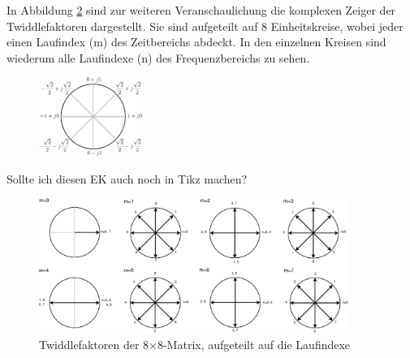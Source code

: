  In Abbildung \ref{pic:Twiddlefaktoren_Darstellung8x8} sind zur weiteren Veranschaulichung die komplexen Zeiger der Twiddlefaktoren dargestellt. Sie sind aufgeteilt auf 8 
 Einheitskreise, wobei jeder einen Laufindex (m) des Zeitbereichs abdeckt. In den einzelnen Kreisen sind wiederum alle Laufindexe (n) des Frequenzbereichs zu sehen.
 

 \begin{figure}[!t]
  \centering
  \includegraphics[width=0.3\textwidth]{img/Einheitskreis-crop.pdf}
  \label{pic:Einheitskreis}
\end{figure}
  
  

  Sollte ich diesen EK auch noch in Tikz machen?


\begin{figure}[!ht]
 \centering
 \includegraphics[width=0.9\textwidth]{img/Twiddlefaktoren_Einheitskreis.eps}
 \caption{Twiddlefaktoren der 8$\times$8-Matrix, aufgeteilt auf die Laufindexe}
 \label{pic:Twiddlefaktoren_Darstellung8x8}
\end{figure}

\vspace{0.5cm}


 

